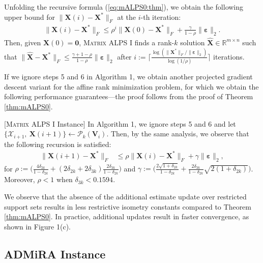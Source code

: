 \documentclass[twocolumn]{svjour3}
\newcommand{\vectornorm}[1]{\|#1\|}
\newcommand{\vectornormbig}[1]{\big\|#1\big\|}
\newcommand{\signal}{\boldsymbol{X}}
\newcommand{\bestsignal}{\boldsymbol{X}^\ast}
\newcommand{\noise}{\boldsymbol{\varepsilon}}
\newcommand{\dimension}{m \times n}
\newcommand{\rank}{k}
\begin{document}
Unfolding the recursive formula (\ref{eq:mALPS0:thm}), we obtain the following upper bound for $ \vectornormbig{\signal(i) - \bestsignal}_F $ at the $ i $-th iteration:
\begin{align}
\vectornormbig{\signal(i) - \bestsignal}_F \leq \rho^{i}\vectornormbig{\signal(0) - \bestsignal}_F + \frac{\gamma}{1-\rho}\vectornormbig{\noise}_2.
\end{align} Then, given $ \signal(0) = \mathbf{0} $, \textsc{Matrix ALPS I} finds a rank-$ \rank $ solution $ \widehat{\signal} \in \mathbb{R}^{\dimension} $ such that $ \vectornormbig{\widehat{\signal} - \bestsignal}_F \leq \frac{\gamma + 1 -\rho}{1-\rho}\vectornormbig{\noise}_2 $ after $ i:= \Big\lceil \frac{\log (\vectornorm{\bestsignal}_F/\vectornorm{\noise}_2)}{\log(1/\rho)} \Big\rceil $ iterations.

If we ignore steps 5 and 6 in Algorithm 1, we obtain another projected gradient descent variant for the affine rank minimization problem, for which we obtain the following performance guarantees---the proof follows from the proof of Theorem \ref{thm:mALPS0}.

\begin{corollary}{\label{cor:1}}[\textsc{Matrix ALPS I} Instance] 
In Algorithm 1, we ignore steps 5 and 6 and let $ \lbrace \mathcal{X}_{i+1},~\signal(i+1) \rbrace \leftarrow \mathcal{P}_\rank (\boldsymbol{V}_i) $. Then, by the same analysis, we observe that the following recursion is satisfied:
\begin{align}
\vectornormbig{\signal(i+1) - \bestsignal}_F &\leq \rho \vectornormbig{\signal(i) - \bestsignal}_F + \gamma \vectornormbig{\noise}_2,
\end{align} for $ \rho:= \Big(\frac{4\delta_{2\rank}}{1-\delta_{2\rank}} + (2\delta_{2\rank} + 2\delta_{3\rank})\frac{2\delta_{3\rank}}{1-\delta_{2\rank}}\Big) $ and $ \gamma := \Big(\frac{2\sqrt{1+\delta_{2\rank}}}{1 - \delta_{2\rank}} + \frac{2\delta_{3\rank}}{1-\delta_{2\rank}}  \sqrt{2(1+\delta_{2\rank})}\Big) $. Moreover, $ \rho < 1 $ when $ \delta_{3\rank} < 0.1594 $.
\end{corollary} 

We observe that the absence of the additional estimate update over restricted support sets results in less restrictive isometry constants compared to Theorem \ref{thm:mALPS0}. In practice, additional updates result in faster convergence, as shown in Figure 1(c).

\subsection{ADMiRA Instance}
\end{document}
